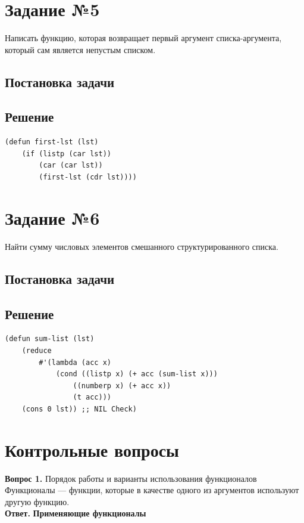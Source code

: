 \documentclass[12pt]{report}
\begin{document}
\section*{Задание №5}
Написать функцию, которая возвращает первый аргумент списка-аргумента, который сам является непустым списком.

\subsection*{Постановка задачи}
\subsection*{Решение}
\begin{lstlisting}
(defun first-lst (lst)
	(if (listp (car lst))
		(car (car lst))
		(first-lst (cdr lst))))
\end{lstlisting}
\clearpage

\section*{Задание №6}
Найти сумму числовых элементов смешанного структурированного списка.

\subsection*{Постановка задачи}
\subsection*{Решение}
\begin{lstlisting}
(defun sum-list (lst)
	(reduce
		#'(lambda (acc x)
			(cond ((listp x) (+ acc (sum-list x)))
				((numberp x) (+ acc x))
				(t acc)))
	(cons 0 lst)) ;; NIL Check)
\end{lstlisting}



\section*{Контрольные вопросы}
\textbf{Вопрос 1.} Порядок работы и варианты использования функционалов\\

Функционалы --- функции, которые в качестве одного из аргументов используют другую функцию.\\

\indent\textbf{Ответ.} \textbf{Применяющие функционалы}\\
\end{document}
